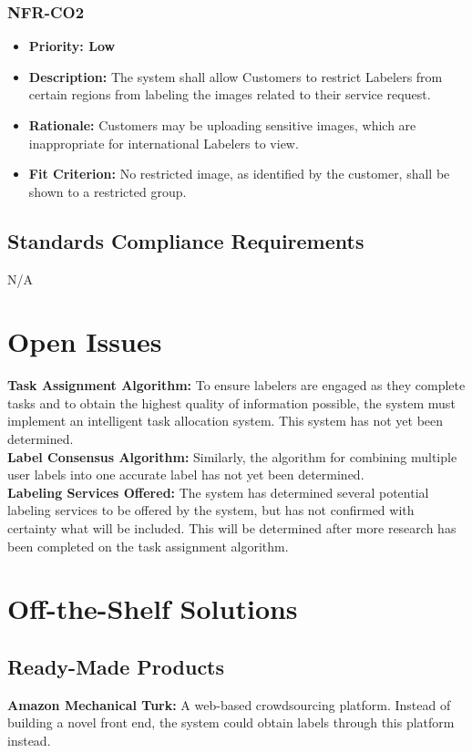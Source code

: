 \documentclass[12pt]{article}
\begin{document}
\subsubsection*{NFR-CO2}
\label{sec:CO2}
\begin{itemize}
  \item \textbf{Priority: Low}
  \item \textbf{Description:} The system shall allow Customers to restrict Labelers from certain regions from labeling the images related to their service request.
  \item \textbf{Rationale:} Customers may be uploading sensitive images, which are inappropriate for international Labelers to view.
  \item \textbf{Fit Criterion:} No restricted image, as identified by the customer, shall be shown to a restricted group.
\end{itemize}
\subsection{Standards Compliance Requirements}
N/A

\section{Open Issues}
\textbf{Task Assignment Algorithm: }To ensure labelers are engaged as they complete tasks and to obtain the highest quality of information possible, the system must implement an intelligent task allocation system. This system has not yet been determined.
\\\textbf{Label Consensus Algorithm: }Similarly, the algorithm for combining multiple user labels into one accurate label has not yet been determined. 
\\\textbf{Labeling Services Offered: }The system has determined several potential labeling services to be offered by the system, but has not confirmed with certainty what will be included. This will be determined after more research has been completed on the task assignment algorithm.

\section{Off-the-Shelf Solutions}
\subsection{Ready-Made Products}
\textbf{Amazon Mechanical Turk: } A web-based crowdsourcing platform. Instead of building a novel front end, the system could obtain labels through this platform instead.
\end{document}

